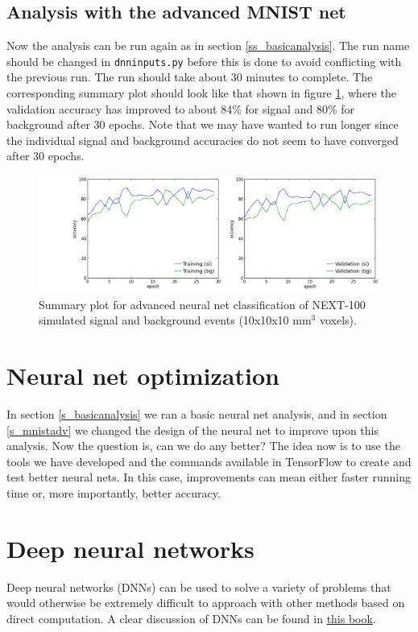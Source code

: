 \documentclass[10pt]{article}
\begin{document}
\subsection{Analysis with the advanced MNIST net}
\noindent Now the analysis can be run again as in section \ref{ss_basicanalysis}.  The run name should be changed in \verb|dnninputs.py| before this is done to avoid conflicting with the
previous run.  The run should take about 30 minutes to complete.  The corresponding summary plot should look like that shown in figure \ref{fig_advsummary}, where the validation accuracy has 
improved to about 84\% for signal and 80\% for background after 30 epochs.  Note that we may have wanted to run longer since the individual signal and background accuracies do not seem to 
have converged after 30 epochs.

\begin{figure}[!ht]
	\centering
	\includegraphics[scale=0.425]{fig/dnn3d_NEXT100_Paolina222_v10x10x10_r200x200x200_adv_summary.png}
	\caption{\label{fig_advsummary}Summary plot for advanced neural net classification of NEXT-100 simulated signal and background events (10x10x10 mm$^3$ voxels).}
\end{figure}

\section{Neural net optimization}
\noindent In section \ref{s_basicanalysis} we ran a basic neural net analysis, and in section \ref{s_mnistadv} we changed the design of the neural net to improve upon this analysis.
Now the question is, can we do any better?  The idea now is to use the tools we have developed and the commands available in TensorFlow to create and test better neural nets.
In this case, improvements can mean either faster running time or, more importantly, better accuracy.

\appendix
\section{Deep neural networks}\label{s_app_dnns}
\noindent Deep neural networks (DNNs) can be used to solve a variety of problems that would otherwise be extremely difficult to approach with other methods based on 
direct computation.  A clear discussion of DNNs can be found in 
\href{http://neuralnetworksanddeeplearning.com/index.html}{this book}.  
\end{document}
